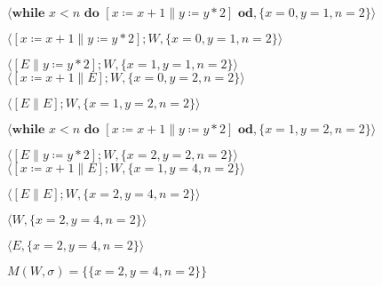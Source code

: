 \documentclass{article}
\begin{document}
\qquad \qquad \qquad \qquad \qquad $ \langle \textbf{while } x<n \textbf{ do } [x \coloneqq x+1 \parallel y \coloneqq y*2] \textbf{ od}, \{x=0,y=1,n=2\} \rangle$

\vspace{10pt}
\vspace{10pt}
\qquad \qquad  \qquad \qquad  \qquad \qquad  $ \langle [x \coloneqq x+1 \parallel y \coloneqq y*2];W, \{x=0,y=1,n=2\} \rangle$

\vspace{10pt}
\vspace{10pt}
$ \langle [E \parallel y \coloneqq y*2];W, \{x=1,y=1,n=2\} \rangle$ \qquad \qquad $ \langle [x \coloneqq x+1 \parallel E];W, \{x=0,y=2,n=2\} \rangle$

\vspace{10pt}
\vspace{10pt}
\qquad \qquad  \qquad \qquad  \qquad \qquad  \qquad $ \langle [E \parallel E];W, \{x=1,y=2,n=2\} \rangle$

\vspace{10pt}
\vspace{10pt}
\qquad \qquad  \qquad \qquad  \qquad $ \langle \textbf{while } x<n \textbf{ do } [x \coloneqq x+1 \parallel y \coloneqq y*2] \textbf{ od}, \{x=1,y=2,n=2\} \rangle$

\vspace{10pt}
\vspace{10pt}
$ \langle [E \parallel y \coloneqq y*2];W, \{x=2,y=2,n=2\} \rangle$ \qquad \qquad $ \langle [x \coloneqq x+1 \parallel E];W, \{x=1,y=4,n=2\} \rangle$

\vspace{10pt}
\vspace{10pt}
\qquad \qquad  \qquad \qquad  \qquad \qquad  \qquad $ \langle [E \parallel E];W, \{x=2,y=4,n=2\} \rangle$

\vspace{10pt}
\vspace{10pt}
\qquad \qquad  \qquad \qquad  \qquad \qquad  \qquad \qquad $ \langle W, \{x=2,y=4,n=2\} \rangle$

\vspace{10pt}
\vspace{10pt}
\qquad \qquad  \qquad \qquad  \qquad \qquad  \qquad \qquad $ \langle E, \{x=2,y=4,n=2\} \rangle$

\vspace{10pt}
$ M(W, \sigma) = \{\{x=2,y=4,n=2\}\} $
\end{document}
